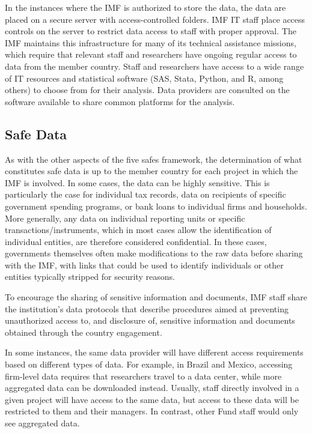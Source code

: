 In the instances where the IMF is authorized to store the data, the data are placed on a secure server with access-controlled folders. IMF IT staff place access controls on the server to restrict data access to staff with proper approval. The IMF maintains this infrastructure for many of its technical assistance missions, which require that relevant staff and researchers have ongoing regular access to data from the member country. Staff and researchers have access to a wide range of IT resources and statistical software (SAS, Stata, Python, and R, among others) to choose from for their analysis. Data providers are consulted on the software available to share common platforms for the analysis.

\hypertarget{safe-data-7}{%
\subsection{Safe Data}\label{safe-data-7}}

As with the other aspects of the five safes framework, the determination of what constitutes safe data is up to the member country for each project in which the IMF is involved. In some cases, the data can be highly sensitive. This is particularly the case for individual tax records, data on recipients of specific government spending programs, or bank loans to individual firms and households. More generally, any data on individual reporting units or specific transactions/instruments, which in most cases allow the identification of individual entities, are therefore considered confidential. In these cases, governments themselves often make modifications to the raw data before sharing with the IMF, with links that could be used to identify individuals or other entities typically stripped for security reasons.

To encourage the sharing of sensitive information and documents, IMF staff share the institution's data protocols that describe procedures aimed at preventing unauthorized access to, and disclosure of, sensitive information and documents obtained through the country engagement.

In some instances, the same data provider will have different access requirements based on different types of data. For example, in Brazil and Mexico, accessing firm-level data requires that researchers travel to a data center, while more aggregated data can be downloaded instead. Usually, staff directly involved in a given project will have access to the same data, but access to these data will be restricted to them and their managers. In contrast, other Fund staff would only see aggregated data.

